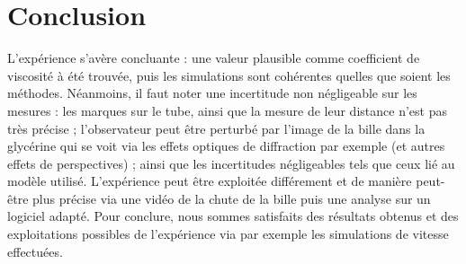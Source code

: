 \section{Conclusion}\label{sec:conclusion}
L'expérience s'avère concluante : une valeur plausible comme coefficient de viscosité à été trouvée,
puis les simulations sont cohérentes quelles que soient les méthodes.
Néanmoins, il faut noter une incertitude non négligeable sur les mesures : les marques sur le tube,
ainsi que la mesure de leur distance n'est pas très précise ;
l'observateur peut être perturbé par l'image de la bille dans la glycérine qui se voit
via les effets optiques de diffraction par exemple (et autres effets de perspectives) ;
ainsi que les incertitudes négligeables tels que ceux lié au modèle utilisé.
L'expérience peut être exploitée différement et de manière peut-être plus précise via une vidéo de
la chute de la bille puis une analyse sur un logiciel adapté.
Pour conclure, nous sommes satisfaits des résultats obtenus et des exploitations possibles de
l'expérience via par exemple les simulations de vitesse effectuées.